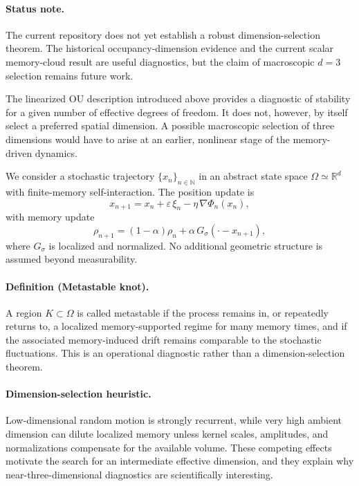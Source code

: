 \documentclass[reprint,amsmath,amssymb,aps,prl,nofootinbib,floatfix]{revtex4-2}
\begin{document}
\paragraph{Status note.}
The current repository does not yet establish a robust dimension-selection theorem. The historical occupancy-dimension evidence and the current scalar memory-cloud result are useful diagnostics, but the claim of macroscopic $d=3$ selection remains future work.

The linearized OU description introduced above provides a diagnostic of stability for a given number of effective degrees of freedom.
It does not, however, by itself select a preferred spatial dimension.
A possible macroscopic selection of three dimensions would have to arise at an earlier, nonlinear stage of the memory-driven dynamics.

We consider a stochastic trajectory $\{x_n\}_{n\in\mathbb{N}}$ in an abstract state space $\Omega\simeq\mathbb{R}^d$ with finite-memory self-interaction.
The position update is
\begin{equation}
x_{n+1} = x_n + \varepsilon\,\xi_n - \eta\,\nabla\Phi_n(x_n),
\label{eq:dyn}
\end{equation}
with memory update
\begin{equation}
\rho_{n+1} = (1-\alpha)\rho_n + \alpha\,G_\sigma(\cdot-x_{n+1}),
\label{eq:mem}
\end{equation}
where $G_\sigma$ is localized and normalized.
No additional geometric structure is assumed beyond measurability.

\paragraph{Definition (Metastable knot).}
A region $K\subset\Omega$ is called metastable if the process remains in,
or repeatedly returns to, a localized memory-supported regime for many memory
times, and if the associated memory-induced drift remains comparable to the
stochastic fluctuations. This is an operational diagnostic rather than a
dimension-selection theorem.

\paragraph{Dimension-selection heuristic.}
Low-dimensional random motion is strongly recurrent, while very high ambient
dimension can dilute localized memory unless kernel scales, amplitudes, and
normalizations compensate for the available volume. These competing effects
motivate the search for an intermediate effective dimension, and they explain
why near-three-dimensional diagnostics are scientifically interesting.
\end{document}
